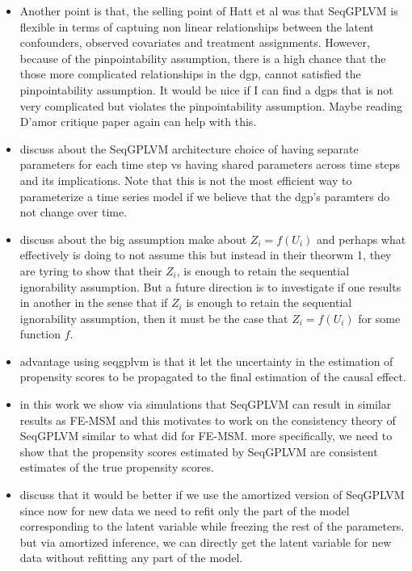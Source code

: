 \begin{itemize}
    \item Another point is that, the selling point of Hatt et al was that SeqGPLVM is flexible in terms of 
    captuing non linear relationships between the latent confounders, observed covariates and treatment assignments. However, 
    because of the pinpointability assumption, there is a high chance that the those more complicated relationships in the dgp, 
    cannot satisfied the pinpointability assumption. It would be nice if I can find a dgps that is not very complicated but 
    violates the pinpointability assumption. Maybe reading D'amor critique paper again can help with this.
    \item discuss about the SeqGPLVM architecture choice of having separate parameters for each time step vs having shared parameters across time steps and its
    implications. Note that this is not the most efficient way to parameterize a time series model if we believe that the dgp's paramters do not change over time.  
    \item discuss about the big assumption \cite{blackwellEffectPoliticalAdvertising2024} 
    make about $Z_i = f(U_i)$ and perhaps what effectively \cite{hattSequentialDeconfoundingCausal2024} 
    is doing to not assume this but instead in their theorwm 1, they are tyring to show that 
    their $Z_i$, is enough to retain the sequential ignorability assumption. But a future 
    direction is to investigate if one results in another in the sense that if 
    $Z_i$ is enough to retain the sequential ignorability assumption, then it must be the case that $Z_i = f(U_i)$ for some function $f$.
    \item advantage using seqgplvm is that it let the uncertainty in the 
    estimation of propensity scores to be propagated to the final 
    estimation of the causal effect. 

    \item in this work we show via simulations that SeqGPLVM can result in similar results as 
    FE-MSM and this motivates to work on the consistency theory of SeqGPLVM similar to 
    what \cite{blackwellEffectPoliticalAdvertising2024} did for FE-MSM. more specifically, 
    we need to show that the propensity scores estimated by SeqGPLVM are 
    consistent estimates of the true propensity scores. 

    \item discuss that it would be better if we use the amortized version of 
    SeqGPLVM since now for new data we need to refit only the part of the model 
    corresponding to the latent variable while freezing the rest of the parameters. 
    but via amortized inference, we can directly get the latent variable for new data without refitting any part of the model.
\end{itemize}

